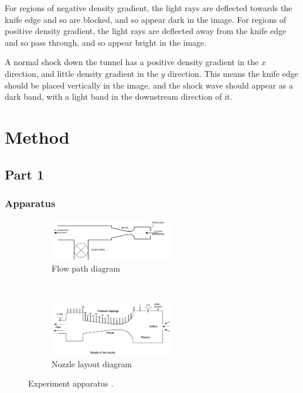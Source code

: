 \documentclass{article}
\begin{document}
For regions of negative density gradient, the light rays are deflected towards the knife edge and so are blocked, and so appear dark in the image.
For regions of positive density gradient, the light rays are deflected away from the knife edge and so pass through, and so appear bright in the image.

A normal shock down the tunnel has a positive density gradient in the $x$ direction, and little density gradient in the $y$ direction.
This means the knife edge should be placed vertically in the image, and the shock wave should appear as a dark band, with a light band in the downstream direction of it.

\section{Method}
\subsection{Part 1}
\subsubsection{Apparatus}

\begin{figure}[H]
    \centering
    \begin{subfigure}{0.8\textwidth}
        \centering
        \includegraphics[width=0.6\textwidth]{flow_layout.png}
        \caption{Flow path diagram}
        \label{fig:flow_layout}
    \end{subfigure}
    ~
    \begin{subfigure}{0.8\textwidth}
        \centering
        \includegraphics[width=0.6\textwidth]{../Supersonic_Nozzle/small_nozzle_layout.png}
        \caption{Nozzle layout diagram}
        \label{fig:nozzle_layout}
    \end{subfigure}
    \caption{Experiment apparatus \cite{lab_manual}.}
\end{figure}
\end{document}
